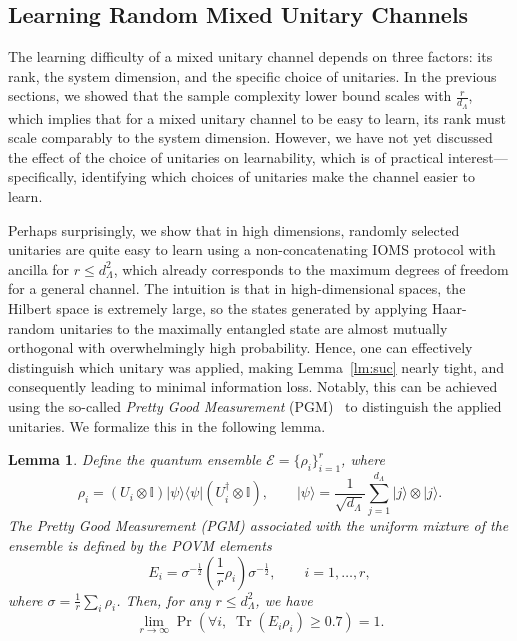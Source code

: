 \documentclass[12pt]{article}
\newtheorem{lemma}{Lemma}
\begin{document}
\subsection{Learning Random Mixed Unitary Channels}

The learning difficulty of a mixed unitary channel depends on three factors: its rank, the system dimension, and the specific choice of unitaries. In the previous sections, we showed that the sample complexity lower bound scales with $\frac{r}{d_{\Lambda}}$, which implies that for a mixed unitary channel to be easy to learn, its rank must scale comparably to the system dimension. However, we have not yet discussed the effect of the choice of unitaries on learnability, which is of practical interest—specifically, identifying which choices of unitaries make the channel easier to learn.

Perhaps surprisingly, we show that in high dimensions, randomly selected unitaries are quite easy to learn using a non-concatenating IOMS protocol with ancilla for $r \le d_{\Lambda}^2$, which already corresponds to the maximum degrees of freedom for a general channel. The intuition is that in high-dimensional spaces, the Hilbert space is extremely large, so the states generated by applying Haar-random unitaries to the maximally entangled state are almost mutually orthogonal with overwhelmingly high probability. Hence, one can effectively distinguish which unitary was applied, making Lemma~\ref{lm:suc} nearly tight, and consequently leading to minimal information loss. Notably, this can be achieved using the so-called \emph{Pretty Good Measurement} (PGM)~\cite{iten2016pgm} to distinguish the applied unitaries. We formalize this in the following lemma.

\begin{lemma}\label{lm:pgmkii}
Define the quantum ensemble $\mathcal{E} = \{\rho_i\}_{i=1}^r$, where
\begin{equation}
    \rho_i = (U_i \otimes \mathbb{I}) 
    \lvert \psi \rangle \langle \psi \rvert 
    (U_i^\dagger \otimes \mathbb{I}), 
    \qquad 
    \lvert \psi \rangle
    = \frac{1}{\sqrt{d_\Lambda}}
      \sum_{j=1}^{d_\Lambda} 
      \lvert j \rangle \otimes \lvert j \rangle .
\end{equation}
The Pretty Good Measurement (PGM) associated with the uniform mixture of the ensemble is defined by the POVM elements
\begin{equation}
    E_i 
    = \sigma^{-\frac{1}{2}}
      \left( \frac{1}{r} \rho_i \right)
      \sigma^{-\frac{1}{2}},
    \qquad i = 1,\dots,r,
\end{equation}
where $\sigma = \frac{1}{r}\sum_i \rho_i$. Then, for any $r \le d_{\Lambda}^2$, we have
\begin{equation}\label{eq:kii}
    \lim_{r\rightarrow\infty} 
    \operatorname{Pr}\!\left(
        \forall i,\; \operatorname{Tr}(E_i\rho_i) \ge 0.7
    \right) = 1.
\end{equation}
\end{lemma}
\end{document}
